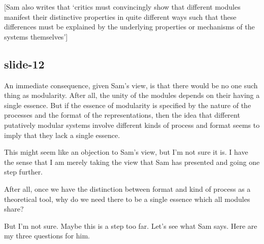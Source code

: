 \documentclass[12pt,\papersize]{extarticle}
\begin{document}
[Sam also writes that
‘critics must convincingly show that different modules manifest their distinctive properties in
quite different ways such that these differences must be explained by the underlying properties or
mechanisms of the systems themselves’]

\subsection{slide-12}
An immediate consequence, given Sam’s view, is that there would be no one
such thing as modularity.
After all, the unity of the modules depends on their having a single essence.
But if the essence of modularity is specified by the nature of the processes
and the format of the representations, then the idea that different putatively
modular systems involve different kinds of process and format seems to imply that
they lack a single essence.

This might seem like an objection to Sam’s view, but I’m not sure it is.
I have the sense that I am merely taking the view that Sam has presented
and going one step further.

After all, once we have the distinction between format and kind of process
as a theoretical tool, why do we need there to be a single essence which all
modules share?

But I’m not sure.  Maybe this is a step too far.
Let’s see what Sam says.
Here are my three questions for him.


        










\end{document}

